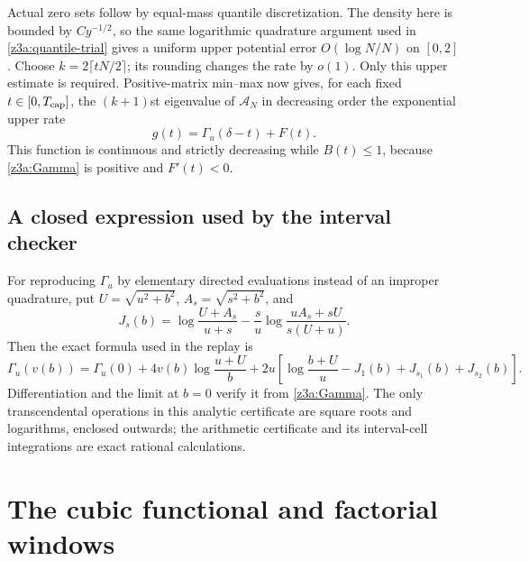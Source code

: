 \documentclass[11pt]{article}
\theoremstyle{definition}\newtheorem{definition}[theorem]{Definition}
\theoremstyle{remark}\newtheorem{remark}[theorem]{Remark}
\begin{document}
Actual zero sets follow by equal-mass quantile discretization.  The
density here is bounded by $Cy^{-1/2}$, so the same logarithmic
quadrature argument used in \eqref{z3a:quantile-trial} gives a uniform
upper potential error $O(\log N/N)$ on $[0,2]$.  Choose
$k=2\lceil tN/2\rceil$; its rounding changes the rate by $o(1)$.  Only
this upper estimate is required.  Positive-matrix min--max now gives,
for each fixed $t\in[0,T_{\rm cap}]$, the $(k+1)$st eigenvalue of
$\mathcal A_N$ in decreasing order the exponential upper rate
\begin{equation}\label{z3a:envelope}
 g(t)=\Gamma_u(\delta-t)+F(t).
\end{equation}
This function is continuous and strictly decreasing while $B(t)\le1$,
because \eqref{z3a:Gamma} is positive and $F'(t)<0$.


\subsection{A closed expression used by the interval checker}

For reproducing $\Gamma_u$ by elementary directed evaluations instead of
an improper quadrature, put $U=\sqrt{u^2+b^2}$,
$A_s=\sqrt{s^2+b^2}$, and
\[
 J_s(b)=\log\frac{U+A_s}{u+s}
 -\frac{s}{u}\log\frac{uA_s+sU}{s(U+u)}.
\]
Then the exact formula used in the replay is
\[
 \Gamma_u(v(b))=\Gamma_u(0)
 +4v(b)\log\frac{u+U}{b}
 +2u\left[\log\frac{b+U}{u}-J_1(b)+J_{s_1}(b)+J_{s_2}(b)\right].
\]
Differentiation and the limit at $b=0$ verify it from
\eqref{z3a:Gamma}.  The only transcendental operations in this analytic
certificate are square roots and logarithms, enclosed outwards; the
arithmetic certificate and its interval-cell integrations are exact
rational calculations.


\section{The cubic functional and factorial windows}
\label{zthree:setup}
\end{document}
